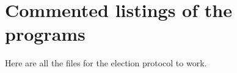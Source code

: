 \documentclass{article}
\begin{document}
\section{Commented listings of the programs}
Here are all the files for the election protocol to work.









\end{document}
